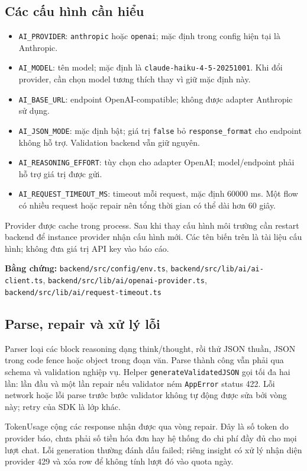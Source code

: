 \documentclass[12pt,a4paper]{article}
\newcommand{\code}[1]{\texttt{#1}}
\newcommand{\evidence}[1]{{\small\nolinkurl{#1}}}
\begin{document}
\subsection{Các cấu hình cần hiểu}
\begin{itemize}
  \item \code{AI\_PROVIDER}: \code{anthropic} hoặc \code{openai}; mặc định trong config hiện tại là Anthropic.
  \item \code{AI\_MODEL}: tên model; mặc định là \code{claude-haiku-4-5-20251001}. Khi đổi provider, cần chọn model tương thích thay vì giữ mặc định này.
  \item \code{AI\_BASE\_URL}: endpoint OpenAI-compatible; không được adapter Anthropic sử dụng.
  \item \code{AI\_JSON\_MODE}: mặc định bật; giá trị \code{false} bỏ \code{response\_format} cho endpoint không hỗ trợ. Validation backend vẫn giữ nguyên.
  \item \code{AI\_REASONING\_EFFORT}: tùy chọn cho adapter OpenAI; model/endpoint phải hỗ trợ giá trị được gửi.
  \item \code{AI\_REQUEST\_TIMEOUT\_MS}: timeout mỗi request, mặc định 60000 ms. Một flow có nhiều request hoặc repair nên tổng thời gian có thể dài hơn 60 giây.
\end{itemize}
Provider được cache trong process. Sau khi thay cấu hình môi trường cần restart backend để instance provider nhận cấu hình mới. Các tên biến trên là tài liệu cấu hình; không đưa giá trị API key vào báo cáo.

\textbf{Bằng chứng:} \evidence{backend/src/config/env.ts}, \evidence{backend/src/lib/ai/ai-client.ts}, \evidence{backend/src/lib/ai/openai-provider.ts}, \evidence{backend/src/lib/ai/request-timeout.ts}

\subsection{Parse, repair và xử lý lỗi}
Parser loại các block reasoning dạng think/thought, rồi thử JSON thuần, JSON trong code fence hoặc object trong đoạn văn. Parse thành công vẫn phải qua schema và validation nghiệp vụ. Helper \code{generateValidatedJSON} gọi tối đa hai lần: lần đầu và một lần repair nếu validator ném \code{AppError} status 422. Lỗi network hoặc lỗi parse trước bước validator không tự động được sửa bởi vòng này; retry của SDK là lớp khác.

TokenUsage cộng các response nhận được qua vòng repair. Đây là số token do provider báo, chưa phải số tiền hóa đơn hay hệ thống đo chi phí đầy đủ cho mọi lượt chat. Lỗi generation thường đánh dấu failed; riêng insight có xử lý nhận diện provider 429 và xóa row để không tính lượt đó vào quota ngày.
\end{document}
